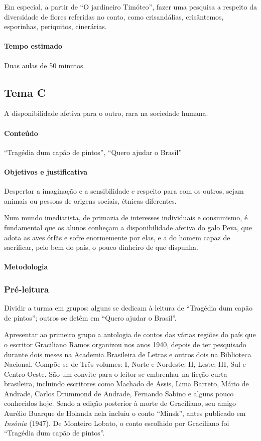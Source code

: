 \documentclass[12pt]{extarticle}
\begin{document}
Em especial, a partir de ``O jardineiro Timóteo'', fazer uma pesquisa a
respeito da diversidade de flores referidas no conto, como crisandálias,
crisântemos, esporinhas, periquitos, cinerárias.

\paragraph{Tempo estimado} Duas aulas de 50 minutos.

\subsection{Tema C}

A disponibilidade afetiva para o outro, rara na sociedade humana.

\paragraph{Conteúdo} ``Tragédia dum capão de pintos'', ``Quero ajudar o Brasil''

\paragraph{Objetivos e justificativa}
Despertar a imaginação e a sensibilidade e respeito para com os outros,
sejam animais ou pessoas de origens sociais, étnicas diferentes.

Num mundo imediatista, de primazia de interesses individuais e
consumismo, é fundamental que os alunos conheçam a disponibilidade
afetiva do galo Peva, que adota as aves órfãs e sofre enormemente por
elas, e a do homem capaz de sacrificar, pelo bem do país, o pouco
dinheiro de que dispunha.

\paragraph{Metodologia}

\subsubsection{Pré-leitura}

Dividir a turma em grupos: alguns se dedicam à leitura de ``Tragédia dum
capão de pintos''; outros se detêm em ``Quero ajudar o Brasil''.

Apresentar ao primeiro grupo a antologia de contos das várias regiões do
país que o escritor Graciliano Ramos organizou nos anos 1940, depois de
ter pesquisado durante dois meses na Academia Brasileira de Letras e
outros dois na Biblioteca Nacional. Compõe-se de Três volumes: I, Norte
e Nordeste; II, Leste; III, Sul e Centro-Oeste. São um convite para o
leitor se embrenhar na ficção curta brasileira, incluindo escritores
como Machado de Assis, Lima Barreto, Mário de Andrade, Carlos Drummond
de Andrade, Fernando Sabino e alguns pouco conhecidos hoje. Sendo a
edição posterior à morte de Graciliano, seu amigo Aurélio Buarque de
Holanda nela incluiu o conto ``Minsk'', antes publicado em
\emph{Insônia} (1947). De Monteiro Lobato, o conto escolhido por
Graciliano foi ``Tragédia dum capão de pintos''.
\end{document}

